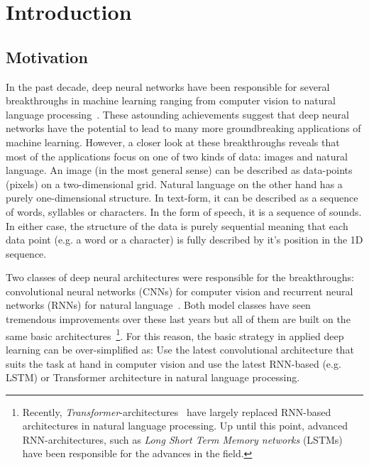 \chapter{Introduction}
\label{chapter:Introduction}


\section{Motivation}
\label{sec:motivation}

In the past decade, deep neural networks have been responsible for several breakthroughs in machine learning ranging from computer vision to natural language processing~\cite{Goodfellow-et-al-2016}. These astounding achievements suggest that deep neural networks have the potential to lead to many more groundbreaking applications of machine learning. However, a closer look at these breakthroughs reveals that most of the applications focus on one of two kinds of data: images and natural language. An image (in the most general sense) can be described as data-points (pixels) on a two-dimensional grid. Natural language on the other hand has a purely one-dimensional structure. In text-form, it can be described as a sequence of words, syllables or characters. In the form of speech, it is a sequence of sounds. In either case, the structure of the data is purely sequential meaning that each data point (e.g. a word or a character) is fully described by it's position in the 1D sequence.

Two classes of deep neural architectures were responsible for the breakthroughs: convolutional neural networks (CNNs) for computer vision and recurrent neural networks (RNNs) for natural language~\cite{Goodfellow-et-al-2016}. Both model classes have seen tremendous improvements over these last years but all of them are built on the same basic architectures~\footnote{Recently, \textit{Transformer}-architectures~\cite{Vaswani2017} have largely replaced RNN-based architectures in natural language processing. Up until this point, advanced RNN-architectures, such as \textit{Long Short Term Memory networks} (LSTMs)~\cite{Hochreiter1997} have been responsible for the advances in the field.}. For this reason, the basic strategy in applied deep learning can be over-simplified as: Use the latest convolutional architecture that suits the task at hand in computer vision and use the latest RNN-based (e.g. LSTM) or Transformer architecture in natural language processing.


